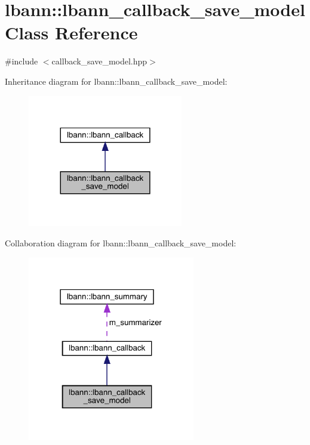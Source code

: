 \hypertarget{classlbann_1_1lbann__callback__save__model}{}\section{lbann\+:\+:lbann\+\_\+callback\+\_\+save\+\_\+model Class Reference}
\label{classlbann_1_1lbann__callback__save__model}


{\ttfamily \#include $<$callback\+\_\+save\+\_\+model.\+hpp$>$}



Inheritance diagram for lbann\+:\+:lbann\+\_\+callback\+\_\+save\+\_\+model\+:\nopagebreak
\begin{figure}[H]
\begin{center}
\leavevmode
\includegraphics[width=192pt]{classlbann_1_1lbann__callback__save__model__inherit__graph}
\end{center}
\end{figure}


Collaboration diagram for lbann\+:\+:lbann\+\_\+callback\+\_\+save\+\_\+model\+:\nopagebreak
\begin{figure}[H]
\begin{center}
\leavevmode
\includegraphics[width=207pt]{classlbann_1_1lbann__callback__save__model__coll__graph}
\end{center}
\end{figure}
